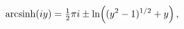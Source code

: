 \[\mathop{\mathrm{arcsinh}\/}\nolimits\!\left(iy\right)=\tfrac{1}{2}\pi i\pm%
\mathop{\ln\/}\nolimits\!\left((y^{2}-1)^{1/2}+y\right),\]